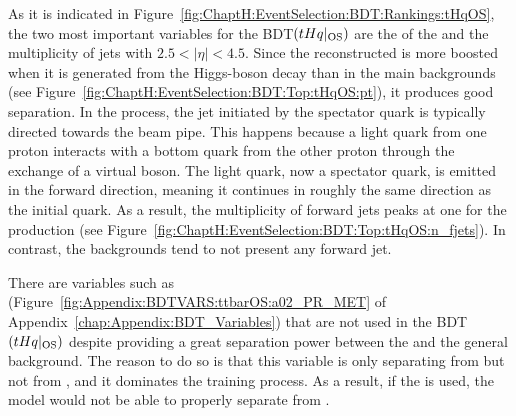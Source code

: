 \FloatBarrier

As it is indicated in Figure~\ref{fig:ChaptH:EventSelection:BDT:Rankings:tHqOS},
the two most important variables for the BDT$(tHq|_{\text{OS}})$ are the \pT of the \tauhad
and the multiplicity of jets with $2.5<|\eta|<4.5$. 
Since the reconstructed \tauhad is more boosted when it is generated from the Higgs-boson decay
than in the main backgrounds %
(see Figure~\ref{fig:ChaptH:EventSelection:BDT:Top:tHqOS:pt}), it produces good separation.
In the \tHq process, the jet initiated by the spectator quark is typically directed towards the beam pipe. 
This happens because a light quark from one proton interacts with a bottom quark from the other proton 
through the exchange of a virtual \PW boson. The light quark, now a spectator quark, is emitted in the 
forward direction, meaning it continues in roughly the same direction as the initial quark. As a result,
the multiplicity of forward jets peaks at one for the \tHq production (see Figure~\ref{fig:ChaptH:EventSelection:BDT:Top:tHqOS:n_fjets}). 
In contrast, the backgrounds tend to not present any forward jet.

There are variables such as \MET (Figure~\ref{fig:Appendix:BDTVARS:ttbarOS:a02_PR_MET} of Appendix~\ref{chap:Appendix:BDT_Variables})
that are not used in the BDT$(tHq|_{\text{OS}})$ despite providing a great separation power between the \tHq and the general background.
The reason to do so is that this variable is only separating \tHq from \Zjets but not from \ttbar, and it dominates the training process.
As a result, if the \MET is used, the model would not be able to properly separate  \ttbar from \tHq.



